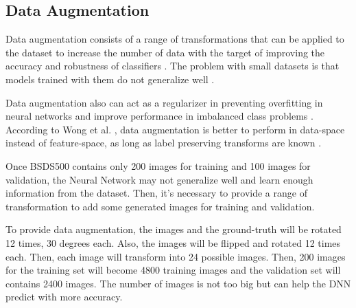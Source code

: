 \documentclass[10pt,twocolumn,letterpaper]{article}
\begin{document}
\subsection{Data Augmentation} \label{ssec:data_augmentation}

Data augmentation consists of a range of transformations that can be applied to the dataset to increase the number of data with the target of improving the accuracy and robustness of classifiers \cite{AUGM_ADAPT}. The problem with small datasets is that models trained with them do not generalize well \cite{AUGM_DEEP}.

Data augmentation also can act as a regularizer in preventing overfitting in neural networks and improve performance in imbalanced class problems \cite{DATA_AUGM}. According to Wong et al. \cite{DATA_AUGM}, data augmentation is better to perform in data-space instead of feature-space, as long as label preserving transforms are known \cite{DATA_AUGM}.

Once BSDS500 contains only 200 images for training and 100 images for validation, the Neural Network may not generalize well and learn enough information from the dataset. Then, it's necessary to provide a range of transformation to add some generated images for training and validation.

To provide data augmentation, the images and the ground-truth will be rotated 12 times, 30 degrees each. Also, the images will be flipped and rotated 12 times each. Then, each image will transform into 24 possible images. Then, 200 images for the training set will become 4800 training images and the validation set will contains 2400 images. The number of images is not too big but can help the DNN predict with more accuracy.


{\small


}
\end{document}
